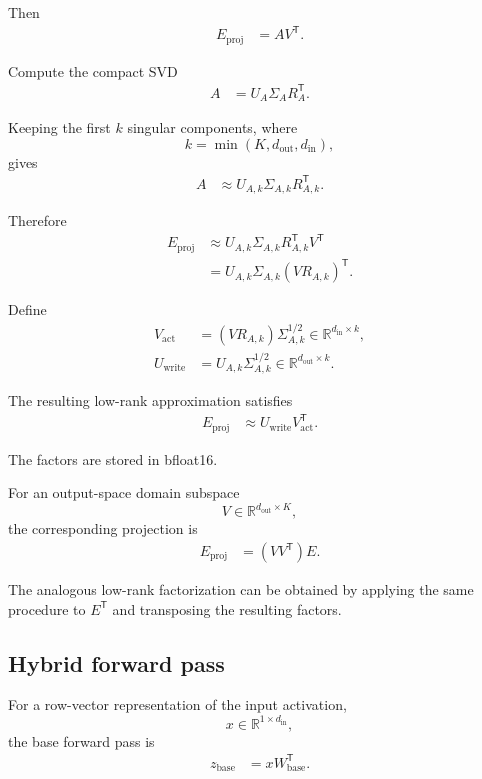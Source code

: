\documentclass[11pt,a4paper]{article}
\begin{document}
Then
\begin{align}
E_{\mathrm{proj}}
&=
AV^{\mathsf T}.
\end{align}

Compute the compact SVD
\begin{align}
A
&=
U_A\Sigma_A R_A^{\mathsf T}.
\end{align}

Keeping the first $k$ singular components, where
\[
k=\min(K,d_{\mathrm{out}},d_{\mathrm{in}}),
\]
gives
\begin{align}
A
&\approx
U_{A,k}\Sigma_{A,k}R_{A,k}^{\mathsf T}.
\end{align}

Therefore
\begin{align}
E_{\mathrm{proj}}
&\approx
U_{A,k}\Sigma_{A,k}
R_{A,k}^{\mathsf T}V^{\mathsf T}
\\
&=
U_{A,k}\Sigma_{A,k}
(VR_{A,k})^{\mathsf T}.
\end{align}

Define
\begin{align}
V_{\mathrm{act}}
&=
(VR_{A,k})\Sigma_{A,k}^{1/2}
\in
\mathbb{R}^{d_{\mathrm{in}}\times k},
\\
U_{\mathrm{write}}
&=
U_{A,k}\Sigma_{A,k}^{1/2}
\in
\mathbb{R}^{d_{\mathrm{out}}\times k}.
\end{align}

The resulting low-rank approximation satisfies
\begin{align}
E_{\mathrm{proj}}
&\approx
U_{\mathrm{write}}V_{\mathrm{act}}^{\mathsf T}.
\end{align}

The factors are stored in bfloat16.

For an output-space domain subspace
\[
V\in\mathbb{R}^{d_{\mathrm{out}}\times K},
\]
the corresponding projection is
\begin{align}
E_{\mathrm{proj}}
&=
(VV^{\mathsf T})E.
\end{align}

The analogous low-rank factorization can be obtained by applying the
same procedure to $E^{\mathsf T}$ and transposing the resulting
factors.

\subsection{Hybrid forward pass}

For a row-vector representation of the input activation,
\[
x\in\mathbb{R}^{1\times d_{\mathrm{in}}},
\]
the base forward pass is
\begin{align}
z_{\mathrm{base}}
&=
xW_{\mathrm{base}}^{\mathsf T}.
\end{align}
\end{document}
